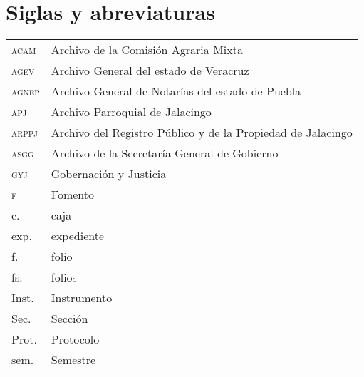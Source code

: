 \documentclass[14pt,twoside,final]{extbook} %
\begin{document}
\chapter*{Siglas y abreviaturas}\label{ch:siglas-y-abreviaturas}
\pagestyle{empty}
\thispagestyle{empty}
\pagestyle{fancy}
\fancyhf{} %
\fancyhead[RO,LE]{\thepage}
\renewcommand{\headrulewidth}{0pt}
\setcounter{page}{17}
\begin{tabular}{ll}
\textsc{acam} & Archivo de la Comisión Agraria Mixta \\
\textsc{agev} & Archivo General del estado de Veracruz \\
\textsc{agnep} & Archivo General de Notarías del estado de Puebla \\
\textsc{apj} & Archivo Parroquial de Jalacingo \\
\textsc{arppj} & Archivo del Registro Público y de la Propiedad de Jalacingo \\
\textsc{asgg} & Archivo de la Secretaría General de Gobierno \\
\textsc{gyj} & Gobernación y Justicia \\
\textsc{f} & Fomento \\
c. & caja \\
exp. & expediente \\
f. & folio \\
fs. & folios \\
Inst. & Instrumento \\
Sec. & Sección \\
Prot. & Protocolo \\
sem. & Semestre \\
\end{tabular}
\end{document}
